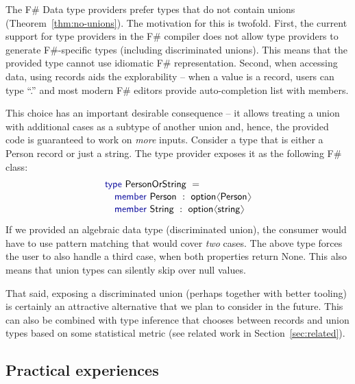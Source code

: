 \documentclass[10pt,preprint,clearpagebib]{sigplanconf}
\newcommand{\langl}{\begin{picture}(4.5,7)
\put(1.1,2.5){\rotatebox{60}{\line(1,0){5.5}}}
\put(1.1,2.5){\rotatebox{300}{\line(1,0){5.5}}}
\end{picture}}
\newcommand{\rangl}{\begin{picture}(4.5,7)
\put(.9,2.5){\rotatebox{120}{\line(1,0){5.5}}}
\put(.9,2.5){\rotatebox{240}{\line(1,0){5.5}}}
\end{picture}}
\newcommand{\kvd}[1]{\textnormal{\textcolor{kvdclr}{\sffamily #1}}}
\newcommand{\ident}[1]{\textnormal{\sffamily #1}}
\begin{document}
The F\# Data type providers prefer types that do not contain unions (Theorem~\ref{thm:no-unions}).
The motivation for this is twofold. First, the current support for type providers in the F\# compiler
does not allow type providers to generate F\#-specific types (including discriminated unions). This
means that the provided type cannot use idiomatic F\# representation. Second, when accessing data,
using records aids the explorability -- when a value is a record, users can type ``.'' and most modern
F\# editors provide auto-completion list with members. 

This choice has an important desirable consequence -- it allows treating a union with additional 
cases as a subtype of another union and, hence, the provided code is guaranteed to work on \emph{more}
inputs. Consider a type that is either a \ident{Person} record or just a string. 
The type provider exposes it as the following F\# class:
%
\begin{equation*}
\begin{array}{l}
 \kvd{type}~\ident{PersonOrString}~=  \\[0.1em]
 \quad \kvd{member}~\ident{Person}~:~\ident{option}\langl \ident{Person}\rangl \\[0.1em]
 \quad \kvd{member}~\ident{String}~:~\ident{option}\langl \ident{string}\rangl \\[0.1em]
\end{array}
\end{equation*}
%
If we provided an algebraic data type (discriminated union), the consumer would have to use pattern
matching that would cover \emph{two} cases. The above type forces the user to also handle a third
case, when both properties return \ident{None}. This also means that union types can silently skip
over \kvd{null} values.

That said, exposing a discriminated union (perhaps together with better tooling) is certainly an
attractive alternative that we plan to consider in the future. This can also be combined with type 
inference that chooses between records and union types based on some statistical metric (see
related work in Section~\ref{sec:related}).


\subsection{Practical experiences}
\end{document}
